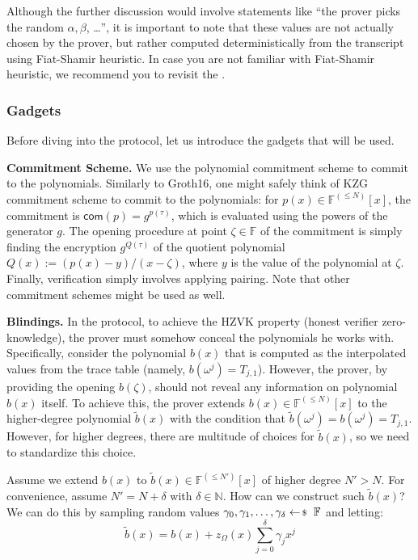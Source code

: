 \documentclass[../lecture-notes-148x210.tex]{subfiles}
\begin{document}
\begin{remark}
    Although the further discussion would involve statements like ``the prover
    picks the random $\alpha,\beta$, \ldots'', it is important to note that
    these values are not actually chosen by the prover, but rather computed
    deterministically from the transcript using Fiat-Shamir heuristic. In case 
    you are not familiar with Fiat-Shamir heuristic, we recommend you to revisit
    the .
\end{remark}

\subsubsection{Gadgets}

Before diving into the protocol, let us introduce the gadgets that will be used.

\textcolor{blue!60!black}{\textbf{Commitment Scheme.}} We use the polynomial
commitment scheme to commit to the polynomials. Similarly to Groth16, one might
safely think of KZG commitment scheme to commit to the polynomials: for $p(x)
\in \mathbb{F}^{(\leq N)}[x]$, the commitment is $\mathsf{com}(p) =
g^{p(\tau)}$, which is evaluated using the powers of the generator $g$. The
opening procedure at point $\zeta \in \mathbb{F}$ of the commitment is simply
finding the encryption $g^{Q(\tau)}$ of the quotient polynomial $Q(x) :=
(p(x)-y)/(x-\zeta)$, where $y$ is the value of the polynomial at $\zeta$.
Finally, verification simply involves applying pairing. Note that other
commitment schemes might be used as well.

\textcolor{blue!60!black}{\textbf{Blindings.}} In the protocol, to achieve 
the HZVK property (honest verifier zero-knowledge), the prover must somehow 
conceal the polynomials he works with. Specifically, consider the polynomial 
$b(x)$ that is computed as the interpolated values from the trace table (namely, 
$b(\omega^j) = T_{j,1}$). However, the prover, by providing the opening $b(\zeta)$,
should not reveal any information on polynomial $b(x)$ itself. To achieve this, the prover
extends $b(x) \in \mathbb{F}^{(\leq N)}[x]$ to the higher-degree polynomial $\widetilde{b}(x)$
with the condition that $\widetilde{b}(\omega^j) = b(\omega^j) = T_{j,1}$. However, for higher 
degrees, there are multitude of choices for $\widetilde{b}(x)$, so we need to standardize 
this choice. 

Assume we extend $b(x)$ to $\widetilde{b}(x) \in \mathbb{F}^{(\leq N')}[x]$ of
higher degree $N'>N$. For convenience, assume $N' = N + \delta$ with $\delta \in
\mathbb{N}$. How can we construct such $\widetilde{b}(x)$? We can do this by
sampling random values $\gamma_0,\gamma_1,\dots,\gamma_{\delta} \leftarrowS \mathbb{F}$ and 
letting:
\begin{equation*}
    \widetilde{b}(x) = b(x) + z_{\Omega}(x)\sum_{j=0}^{\delta}\gamma_jx^j
\end{equation*}
\end{document}
